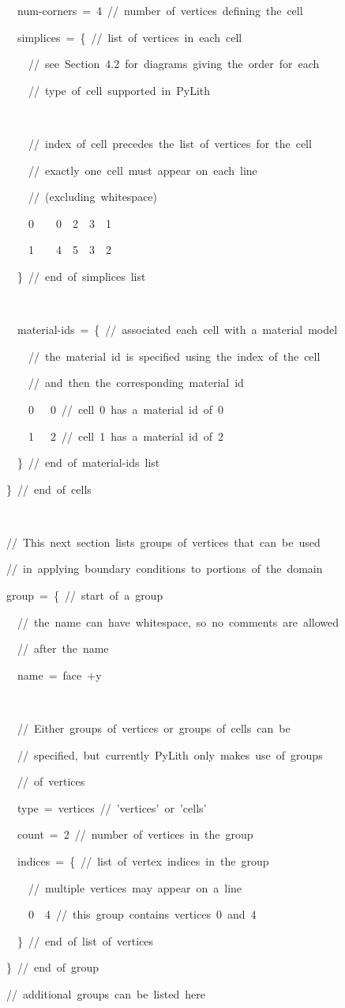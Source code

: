 \begin{lyxcode}
~~~~num-corners~=~4~//~number~of~vertices~defining~the~cell

~~~~simplices~=~\{~//~list~of~vertices~in~each~cell

~~~~~~//~see~Section~4.2~for~diagrams~giving~the~order~for~each~

~~~~~~//~type~of~cell~supported~in~PyLith

~

~~~~~~//~index~of~cell~precedes~the~list~of~vertices~for~the~cell~



~~~~~~//~exactly~one~cell~must~appear~on~each~line

~~~~~~//~(excluding~whitespace)

~~~~~~0~~~~0~~2~~3~~1

~~~~~~1~~~~4~~5~~3~~2

~~~~\}~//~end~of~simplices~list

~

~~~~material-ids~=~\{~//~associated~each~cell~with~a~material~model

~~~~~~//~the~material~id~is~specified~using~the~index~of~the~cell~

~~~~~~//~and~then~the~corresponding~material~id

~~~~~~0~~~0~//~cell~0~has~a~material~id~of~0

~~~~~~1~~~2~//~cell~1~has~a~material~id~of~2

~~~~\}~//~end~of~material-ids~list

~~\}~//~end~of~cells

~

~~//~This~next~section~lists~groups~of~vertices~that~can~be~used

~~//~in~applying~boundary~conditions~to~portions~of~the~domain

~~group~=~\{~//~start~of~a~group

~~~~//~the~name~can~have~whitespace,~so~no~comments~are~allowed

~~~~//~after~the~name

~~~~name~=~face~+y

~

~~~~//~Either~groups~of~vertices~or~groups~of~cells~can~be~~~~~

~~~~//~specified,~but~currently~PyLith~only~makes~use~of~groups~

~~~~//~of~vertices

~~~~type~=~vertices~//~'vertices'~or~'cells'

~~~~count~=~2~//~number~of~vertices~in~the~group

~~~~indices~=~\{~//~list~of~vertex~indices~in~the~group

~~~~~~//~multiple~vertices~may~appear~on~a~line

~~~~~~0~~4~//~this~group~contains~vertices~0~and~4

~~~~\}~//~end~of~list~of~vertices

~~\}~//~end~of~group

~~//~additional~groups~can~be~listed~here
\end{lyxcode}
